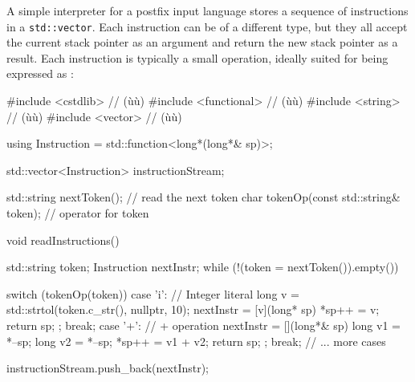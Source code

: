 A simple interpreter for a postfix input language stores a sequence of
instructions in a \lstinline!std::vector!. Each instruction can be of a
different type, but they all accept the current stack pointer as an
argument and return the new stack pointer as a result. Each instruction
is typically a small operation, ideally suited for being expressed as
:

\begin{emcppslisting}
#include <cstdlib>     // (ù{}ù)
#include <functional>  // (ù{}ù)
#include <string>      // (ù{}ù)
#include <vector>      // (ù{}ù)

using Instruction = std::function<long*(long*& sp)>;

std::vector<Instruction> instructionStream;

std::string nextToken();                 // read the next token
char tokenOp(const std::string& token);  // operator for token

void readInstructions()
{
    std::string token;
    Instruction nextInstr;
    while (!(token = nextToken()).empty())
    {
        switch (tokenOp(token))
        {
            case 'i':
            {
                // Integer literal
                long v = std::strtol(token.c_str(), nullptr, 10);
                nextInstr = [v](long* sp){ *sp++ = v; return sp; };
                break;
            }
            case '+':
            {
                // + operation
                nextInstr = [](long*& sp){
                    long v1 = *--sp;
                    long v2 = *--sp;
                    *sp++ = v1 + v2;
                    return sp;
                };
                break;
            }
            // ... more cases
        }

        instructionStream.push_back(nextInstr);
    }
}
\end{emcppslisting}
    

